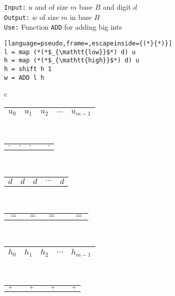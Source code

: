 \begin{figure}
  \centering
  \begin{minipage}{0.45\textwidth}
    \small
    \texttt{Input:} $u$ and of size $m$ base $B$ and digit $d$\\
    \texttt{Output:} $w$ of size $m$ in base $B$\\
    \texttt{Use:} Function \texttt{ADD} for adding big ints
\begin{lstlisting}[language=pseudo,frame=,escapeinside={(*}{*)}]
l = map (*(*$_{\mathtt{low}}$*) d) u
h = map (*(*$_{\mathtt{high}}$*) d) u
h = shift h 1
w = ADD l h
\end{lstlisting}
  \end{minipage}
  \begin{minipage}{0.45\textwidth}
    \centering
    \footnotesize
    \begin{tabular}{c}
      \begin{tabular}{|C{0.7cm}|C{0.7cm}|C{0.7cm}|C{0.7cm}|C{0.7cm}|}
        \hline
        $u_0$ & $u_1$ & $u_2$ & $\cdots$ & $u_{m-1}$\\ 
        \hline
      \end{tabular}\\[-0.3ex]
      \begin{tabular}{C{0.7cm}C{0.7cm}C{0.7cm}C{0.7cm}C{0.7cm}}
        $\cdot$ & $\cdot$ & $\cdot$ & & $\cdot$\\ 
      \end{tabular}\\[-0.7ex]
      \begin{tabular}{C{0.7cm}C{0.7cm}C{0.7cm}C{0.7cm}C{0.7cm}}
        $d$ & $d$ &  $d$ & $\cdots$ &$d$ \\
      \end{tabular}\\[-0.5ex]
      \begin{tabular}{C{0.7cm}C{0.7cm}C{0.8cm}C{0.7cm}C{0.7cm}}
        $=$ & $=$ & $=$ &  & $=$  
      \end{tabular}\\
      \begin{tabular}{|C{0.7cm}|C{0.7cm}|C{0.7cm}|C{0.7cm}|C{0.7cm}|}
        \hline
        $h_{0}$ & $h_1$ & $h_2$ & $\cdots$ & $h_{m-1}$\\
        \hline
      \end{tabular}\\
      \begin{tabular}{C{0.15cm}C{0.15cm}C{0.15cm}C{0.15cm}C{0.15cm}C{0.15cm}C{0.15cm}}
        \diagonalarrowdown{}$_+$ & & \diagonalarrowdown{}$_+$ &  & \diagonalarrowdown{}$_+$  &  & \diagonalarrowdown{}$_+$ \\

\end{tabular}
\end{tabular}
\end{minipage}
\end{figure}
